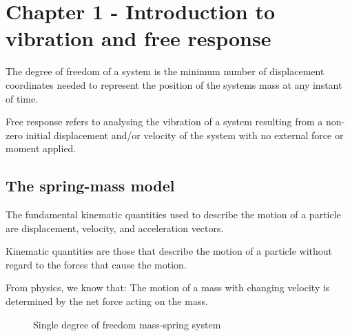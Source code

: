 \chapter*{Chapter 1 - Introduction to vibration and free response}

  \begin{fmd-definition}
    The degree of freedom of a system is the minimum number of displacement coordinates needed to represent the position of the systems mass at any instant of time.
  \end{fmd-definition}

  \begin{fmd-definition}
    Free response refers to analysing the vibration of a system resulting from a non-zero initial displacement and/or velocity of the system with no external force or moment applied.
  \end{fmd-definition}

  \section{The spring-mass model}
    The fundamental kinematic quantities used to describe the motion of a particle are displacement, velocity, and acceleration vectors.

    \begin{fmd-definition}[Kinematic]
      Kinematic quantities are those that describe the motion of a particle without regard to the forces that cause the motion.
    \end{fmd-definition}

    From physics, we know that: The motion of a mass with changing velocity is determined by the net force acting on the mass.
    \begin{figure}
      \centering
      \caption{Single degree of freedom mass-spring system}\label{fig:single-dof-mass-spring}
    \end{figure}

